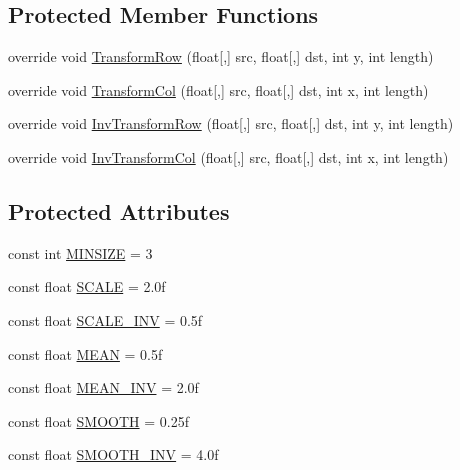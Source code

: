 \subsection*{Protected Member Functions}
\begin{DoxyCompactItemize}
\item 
override void \hyperlink{class_turbo_wavelets_1_1_biorthogonal53_wavelet2_d_acec9bb2730e6dee78c8f6d5c8d79a523}{Transform\+Row} (float\mbox{[},\mbox{]} src, float\mbox{[},\mbox{]} dst, int y, int length)
\item 
override void \hyperlink{class_turbo_wavelets_1_1_biorthogonal53_wavelet2_d_aa93cd7f9ac110e04678a5313336fb73f}{Transform\+Col} (float\mbox{[},\mbox{]} src, float\mbox{[},\mbox{]} dst, int x, int length)
\item 
override void \hyperlink{class_turbo_wavelets_1_1_biorthogonal53_wavelet2_d_a74b2789642a900fcfab4f47e023329ed}{Inv\+Transform\+Row} (float\mbox{[},\mbox{]} src, float\mbox{[},\mbox{]} dst, int y, int length)
\item 
override void \hyperlink{class_turbo_wavelets_1_1_biorthogonal53_wavelet2_d_a2f52053d7f8f2da84b0ca6964481bd06}{Inv\+Transform\+Col} (float\mbox{[},\mbox{]} src, float\mbox{[},\mbox{]} dst, int x, int length)
\end{DoxyCompactItemize}
\subsection*{Protected Attributes}
\begin{DoxyCompactItemize}
\item 
const int \hyperlink{class_turbo_wavelets_1_1_biorthogonal53_wavelet2_d_aa6981c16a1765d4664747274676d5eba}{M\+I\+N\+S\+I\+Z\+E} = 3
\item 
const float \hyperlink{class_turbo_wavelets_1_1_biorthogonal53_wavelet2_d_af0ccd844200200f57839dea6823daaa6}{S\+C\+A\+L\+E} = 2.\+0f
\item 
const float \hyperlink{class_turbo_wavelets_1_1_biorthogonal53_wavelet2_d_a035bc7a8559c9e4eb476c6a1c1d8cc9a}{S\+C\+A\+L\+E\+\_\+\+I\+N\+V} = 0.\+5f
\item 
const float \hyperlink{class_turbo_wavelets_1_1_biorthogonal53_wavelet2_d_ab01bdb5e655a9f02b6ed6337ad88e4e4}{M\+E\+A\+N} = 0.\+5f
\item 
const float \hyperlink{class_turbo_wavelets_1_1_biorthogonal53_wavelet2_d_a087508fa3e1f6e94477310a061d09784}{M\+E\+A\+N\+\_\+\+I\+N\+V} = 2.\+0f
\item 
const float \hyperlink{class_turbo_wavelets_1_1_biorthogonal53_wavelet2_d_ac608d0d31583d5c06c6dd7ab41880cb6}{S\+M\+O\+O\+T\+H} = 0.\+25f
\item 
const float \hyperlink{class_turbo_wavelets_1_1_biorthogonal53_wavelet2_d_aeb90da1672a5e2fd88863bf227ee6db9}{S\+M\+O\+O\+T\+H\+\_\+\+I\+N\+V} = 4.\+0f
\end{DoxyCompactItemize}
